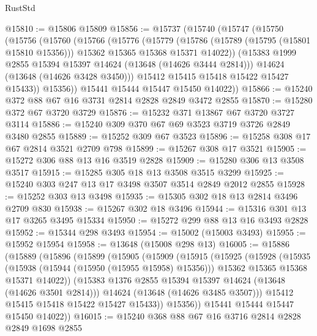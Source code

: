 \begin{lexlean}{RustStd}
\begin{coremodule}
@15810 := @15806 @15809
@15856 := @15737
    (@15740
      (@15747
        (@15750
          (@15756
            (@15760
              (@15766
                (@15776
                  (@15779
                    (@15786
                      (@15789 (@15795 (@15801 @15810 @15356)))
                      @15362
                      @15365
                      @15368
                      @15371
                      @14022))
                  (@15383 @1999 @2855 @15394 @15397 @14624 (@13648 (@14626 @3444 @2814)))
                  @14624
                  (@13648 (@14626 @3428 @3450)))
                @15412
                @15415
                @15418
                @15422
                @15427
                @15433))
            @15356))
        @15441
        @15444
        @15447
        @15450
        @14022))
@15866 := @15240 @372 @88 @67 @16 @3731 @2814 @2828 @2849 @3472 @2855
@15870 := @15280 @372 @67 @3720 @3729
@15876 := @15232 @371 @13867 @67 @3720 @3727 @3114
@15886 := @15240 @309 @370 @67 @69 @3523 @3719 @3726 @2849 @3480 @2855
@15889 := @15252 @309 @67 @3523
@15896 := @15258 @308 @17 @67 @2814 @3521 @2709 @798
@15899 := @15267 @308 @17 @3521
@15905 := @15272 @306 @88 @13 @16 @3519 @2828
@15909 := @15280 @306 @13 @3508 @3517
@15915 := @15285 @305 @18 @13 @3508 @3515 @3299
@15925 := @15240 @303 @247 @13 @17 @3498 @3507 @3514 @2849 @2012 @2855
@15928 := @15252 @303 @13 @3498
@15935 := @15305 @302 @18 @13 @2814 @3496 @2709 @830
@15938 := @15267 @302 @18 @3496
@15944 := @15316 @301 @13 @17 @3265 @3495 @15334
@15950 := @15272 @299 @88 @13 @16 @3493 @2828
@15952 := @15344 @298 @3493
@15954 := @15002 (@15003 @3493)
@15955 := @15952 @15954
@15958 := @13648 (@15008 @298 @13)
@16005 := @15886
    (@15889
      (@15896
        (@15899
          (@15905
            (@15909
              (@15915
                (@15925
                  (@15928
                    (@15935
                      (@15938 (@15944 (@15950 (@15955 @15958) @15356)))
                      @15362
                      @15365
                      @15368
                      @15371
                      @14022))
                  (@15383 @1376 @2855 @15394 @15397 @14624 (@13648 (@14626 @3501 @2814)))
                  @14624
                  (@13648 (@14626 @3485 @3507)))
                @15412
                @15415
                @15418
                @15422
                @15427
                @15433))
            @15356))
        @15441
        @15444
        @15447
        @15450
        @14022))
@16015 := @15240 @368 @88 @67 @16 @3716 @2814 @2828 @2849 @1698 @2855

\end{coremodule}
\end{lexlean}
